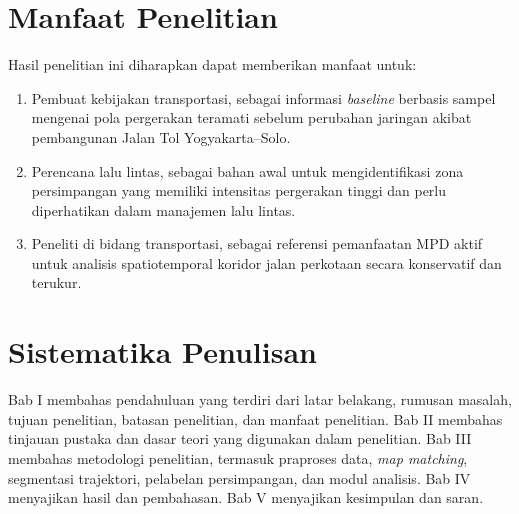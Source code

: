\section{Manfaat Penelitian}

Hasil penelitian ini diharapkan dapat memberikan manfaat untuk:
\begin{enumerate}
    \item Pembuat kebijakan transportasi, sebagai informasi \textit{baseline} berbasis sampel mengenai pola pergerakan teramati sebelum perubahan jaringan akibat pembangunan Jalan Tol Yogyakarta--Solo.
    \item Perencana lalu lintas, sebagai bahan awal untuk mengidentifikasi zona persimpangan yang memiliki intensitas pergerakan tinggi dan perlu diperhatikan dalam manajemen lalu lintas.
    \item Peneliti di bidang transportasi, sebagai referensi pemanfaatan MPD aktif untuk analisis spatiotemporal koridor jalan perkotaan secara konservatif dan terukur.
\end{enumerate}

\section{Sistematika Penulisan}

Bab I membahas pendahuluan yang terdiri dari latar belakang, rumusan masalah, tujuan penelitian, batasan penelitian, dan manfaat penelitian. Bab II membahas tinjauan pustaka dan dasar teori yang digunakan dalam penelitian. Bab III membahas metodologi penelitian, termasuk praproses data, \textit{map matching}, segmentasi trajektori, pelabelan persimpangan, dan modul analisis. Bab IV menyajikan hasil dan pembahasan. Bab V menyajikan kesimpulan dan saran.
